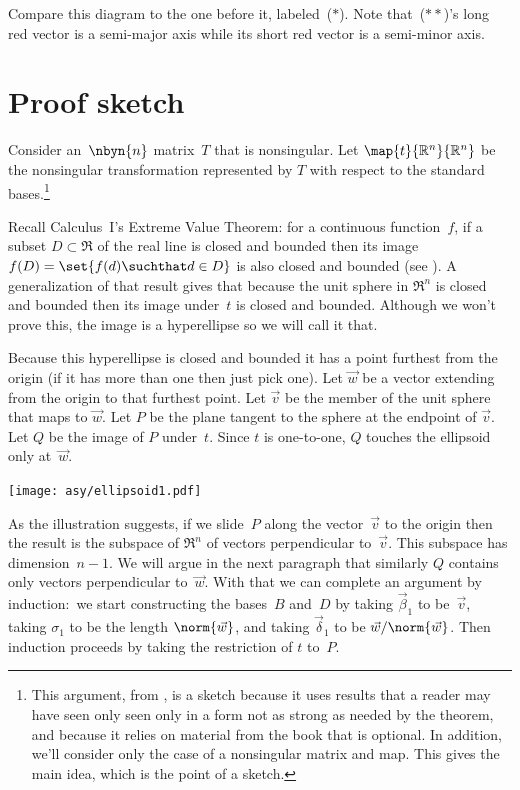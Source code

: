 Compare this diagram to the one before it, 
labeled~($*$).
Note that~($**$)'s
long red vector is a
semi-major axis while its short red vector is a 
semi-minor axis.



\section{Proof sketch}

Consider an~$\nbyn{n}$ matrix~$T$ that is nonsingular.
Let $\map{t}{\Re^n}{\Re^n}$ be the
nonsingular transformation represented by
$T$ with respect to the standard bases.\footnote{%
  This argument, 
  from \protect\cite{BlankKrikorianSpring89},
  is a sketch because it uses results that a reader may have seen only 
  seen only in a form not as strong as needed by the theorem, 
  and because it relies on material from the book that is optional.
  In addition, we'll consider only the case of a nonsingular matrix and map.
  This gives the main idea, which is the point of a sketch.}

Recall Calculus~I's Extreme Value Theorem: for a continuous
function~$f$, if a subset $D\subset \Re$ of the real line 
is closed and bounded then
its image $f(D)=\set{f(d)\suchthat d\in D}$ 
is also closed and bounded (see \cite{wiki:ExtremeValueThm}).
A generalization of that result gives that because the unit sphere in $\Re^n$
is closed and bounded then its image under~$t$ is closed and bounded.
Although we won't prove this, the image is a hyperellipse
so we will call it that. 

Because this hyperellipse is closed and bounded it has a 
point furthest from the origin (if it has more than one then just pick one).
Let $\vec{w}$ be a vector extending from the origin to that furthest point.
Let $\vec{v}$ be the member of the unit sphere that maps to $\vec{w}$.
Let $P$ be the plane tangent to the sphere at the endpoint of $\vec{v}$.
Let $Q$ be the image of $P$ under~$t$.
Since $t$ is one-to-one, $Q$ touches the ellipsoid only at~$\vec{w}$.
\begin{center}
  \texttt{[image: asy/ellipsoid1.pdf]}
\end{center}

As the illustration suggests, if we slide~$P$ along the 
vector~$\vec{v}$ to
the origin then the result is 
the subspace of $\Re^n$ of vectors perpendicular
to~$\vec{v}$.
This subspace has dimension~$n-1$. 
We will argue in the next paragraph 
that similarly $Q$ contains only
vectors perpendicular to~$\vec{w}$.
With that we can complete an argument by induction:~we 
start constructing the 
bases~$B$ and~$D$ by taking $\vec{\beta}_1$ to be~$\vec{v}$, taking
$\sigma_1$ to be the length $\norm{\vec{w}}$, and taking
$\vec{\delta}_1$ to be $\vec{w}/\norm{\vec{w}}$.
Then induction proceeds by taking the restriction of $t$ to~$P$.

